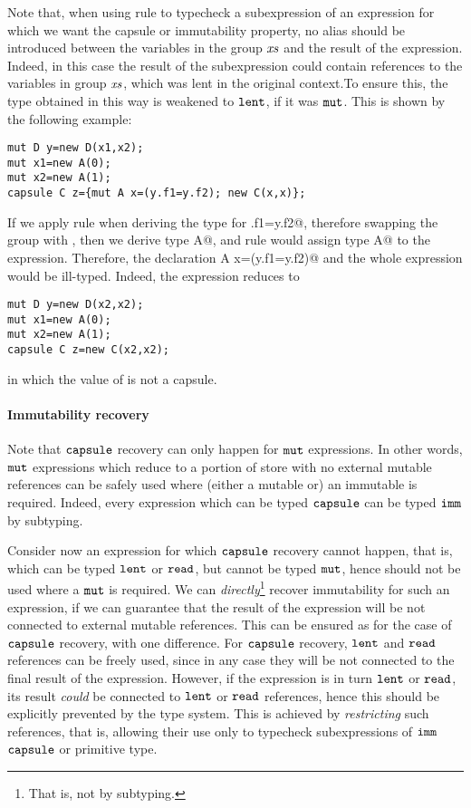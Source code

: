 {Note that, when using rule  to typecheck a subexpression of an expression {for which we want the capsule or immutability property}, no alias should be introduced between the variables in the group $\mathit{xs}$ and the result of the expression.  Indeed, in this case the result of the subexpression could contain references to the variables in group $\mathit{xs}$, which was lent in the original context.To ensure this, the type obtained in this way is weakened to $\texttt{lent}$, if it was $\texttt{mut}$. 
 This is shown by the following example:
\begin{lstlisting}
mut D y=new D(x1,x2);  
mut x1=new A(0); 
mut x2=new A(1);
capsule C z={mut A x=(y.f1=y.f2); new C(x,x)};
\end{lstlisting}
If we apply rule  when deriving the
type for \Q@y.f1=y.f2@, therefore swapping the group \Q@y@ with \Q@x@, then we derive type
\Q@mut A@, and rule  would assign type \Q@lent A@ to the expression.
Therefore, the declaration \Q@mut A x=(y.f1=y.f2)@ and the whole expression would be ill-typed.
Indeed, the expression reduces to
\begin{lstlisting}
mut D y=new D(x2,x2);  
mut x1=new A(0); 
mut x2=new A(1);
capsule C z=new C(x2,x2);
\end{lstlisting}
in which the value of \Q@z@ is not a capsule.

\paragraph{{Immutability recovery}} 
{Note that $\texttt{capsule}$ recovery can only happen for $\texttt{mut}$ expressions. In other words, $\texttt{mut}$ expressions which reduce to a portion of store with no external mutable references can be safely used where (either a mutable or) an immutable is required. Indeed, every expression which can be typed $\texttt{capsule}$ can be typed $\texttt{imm}$ by subtyping. }

{Consider now an expression for which $\texttt{capsule}$ recovery cannot happen, that is, which can be typed $\texttt{lent}$ or $\texttt{read}$, but cannot be typed $\texttt{mut}$, hence should not be used where a $\texttt{mut}$ is required. We can \emph{directly}\footnote{That is, not by subtyping.} recover immutability for such an expression, if we can guarantee that the result of the expression will be not connected to external mutable references.   This can be ensured as for the case of $\texttt{capsule}$ recovery, with one difference. For $\texttt{capsule}$ recovery, $\texttt{lent}$ and $\texttt{read}$ references can be freely used, since in any case they will be not connected to the final result of the expression. However, if the expression is in turn $\texttt{lent}$ or $\texttt{read}$, its result \emph{could} be connected to $\texttt{lent}$ or $\texttt{read}$ references, hence this should be explicitly prevented by the type system. This is achieved by \emph{restricting} such references, that is, allowing their use only to typecheck subexpressions of $\texttt{imm}$ $\texttt{capsule}$ or primitive type.}

}
